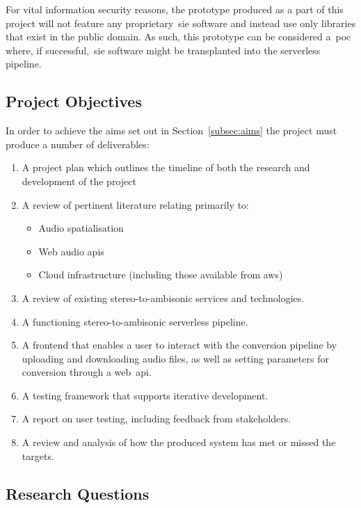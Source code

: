 For vital information security reasons, the prototype produced as a part of this project will not feature any proprietary~\gls{sie} software and instead use only libraries that exist in the public domain.
As such, this prototype can be considered a~\gls{poc} where, if successful,~\gls{sie} software might be transplanted into the serverless pipeline.

\subsection{Project Objectives}\label{subsec:project-objectives}

In order to achieve the aims set out in Section~\ref{subsec:aims} the project must produce a number of deliverables:

\begin{enumerate}
    \item A project plan which outlines the timeline of both the research and development of the project
    \item A review of pertinent literature relating primarily to:
    \begin{itemize}
        \item Audio spatialisation
        \item Web audio \glspl{api}
        \item Cloud infrastructure (including those available from \gls{aws})
    \end{itemize}
    \item A review of existing stereo-to-ambisonic services and technologies.
    \item A functioning stereo-to-ambisonic serverless pipeline.
    \item A frontend that enables a user to interact with the conversion pipeline by uploading and downloading audio files, as well as setting parameters for conversion through a web~\gls{api}.
    \item A testing framework that supports iterative development.
    \item A report on user testing, including feedback from stakeholders.
    \item A review and analysis of how the produced system has met or missed the targets.
\end{enumerate}

\subsection{Research Questions}\label{subsec:research-questions}

